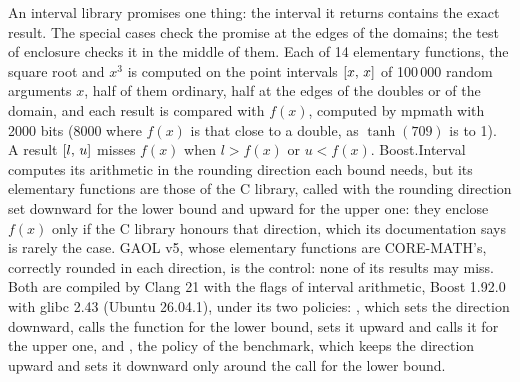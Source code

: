 \documentclass[12pt,a4paper,twoside,openright]{book}
\begin{document}
An interval library promises one thing: the interval it returns contains
the exact result. The special cases check the promise at the edges of the
domains; the test of enclosure checks it in the middle of them. Each of 14
elementary functions, the square root and $x^3$ is computed on the point
intervals $[x,\,x]$ of 100\,000 random arguments $x$, half of them
ordinary, half at the edges of the doubles or of the domain, and each result
is compared with $f(x)$, computed by mpmath with 2000 bits (8000 where
$f(x)$ is that close to a double, as $\tanh(709)$ is to 1). A result
$[l,\,u]$ misses $f(x)$ when $l > f(x)$ or $u < f(x)$. Boost.Interval
computes its arithmetic in the rounding direction each bound needs, but its
elementary functions are those of the C library, called with the rounding
direction set downward for the lower bound and upward for the upper one:
they enclose $f(x)$ only if the C library honours that direction, which its
documentation says is rarely the case. GAOL v5, whose elementary functions
are CORE-MATH's, correctly rounded in each direction, is the control: none
of its results may miss. Both are compiled by Clang 21 with the flags of
interval arithmetic, Boost 1.92.0 with glibc 2.43 (Ubuntu 26.04.1), under
its two policies: , which sets the direction
downward, calls the function for the lower bound, sets it upward and calls
it for the upper one, and , the policy of the
benchmark, which keeps the direction upward and sets it downward only around
the call for the lower bound.
\end{document}
